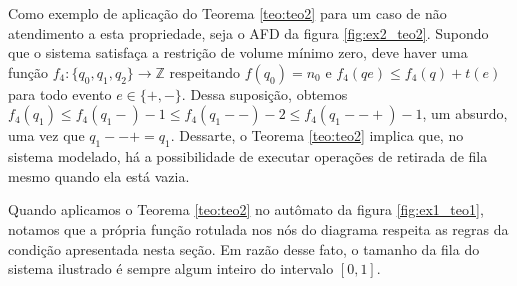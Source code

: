 Como exemplo de aplicação do Teorema \ref{teo:teo2} para um caso de não atendimento a esta propriedade, seja o AFD da figura \ref{fig:ex2_teo2}. Supondo que o sistema satisfaça a restrição de volume mínimo zero, deve haver uma função $f_4 : \{ q_0, q_1, q_2 \} \to \mathbb{Z}$ respeitando $f(q_0) = n_0$ e $f_4(qe) \leq f_4(q) + t(e)$ para todo evento $e \in \{+, -\}$. Dessa suposição, obtemos $f_4(q_1) \leq f_4(q_1-) - 1 \leq f_4(q_1--) - 2 \leq f_4(q_1--+) - 1$, um absurdo, uma vez que $q_1--+ = q_1$. Dessarte, o Teorema \ref{teo:teo2} implica que, no sistema modelado, há a possibilidade de executar operações de retirada de fila mesmo quando ela está vazia.


Quando aplicamos o Teorema \ref{teo:teo2} no autômato da figura \ref{fig:ex1_teo1}, notamos que a própria função rotulada nos nós do diagrama respeita as regras da condição apresentada nesta seção. Em razão desse fato, o tamanho da fila do sistema ilustrado é sempre algum inteiro do intervalo $[0,1]$.
